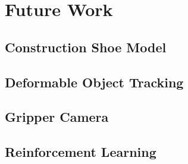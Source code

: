 \chapter{Future Work}

\section{Construction Shoe Model}
\section{Deformable Object Tracking}
\section{Gripper Camera}
\section{Reinforcement Learning}
